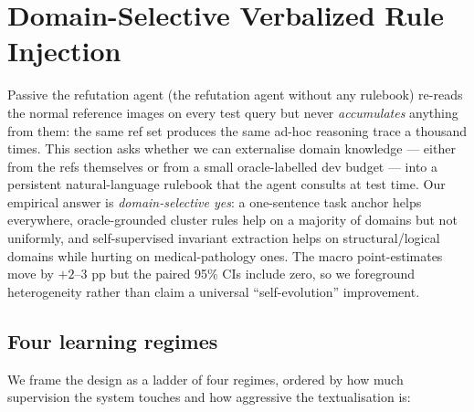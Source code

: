 \section{Domain-Selective Verbalized Rule Injection}
\label{sec:verbalized}

Passive the refutation agent (the refutation agent without any rulebook) re-reads the normal
reference images on every test query but never \emph{accumulates}
anything from them: the same ref set produces the same ad-hoc
reasoning trace a thousand times. This section asks whether we can
externalise domain knowledge --- either from the refs themselves or
from a small oracle-labelled dev budget --- into a persistent
natural-language rulebook that the agent consults at test time.
Our empirical answer is \emph{domain-selective yes}: a
one-sentence task anchor helps everywhere, oracle-grounded cluster
rules help on a majority of domains but not uniformly, and
self-supervised invariant extraction helps on structural/logical
domains while hurting on medical-pathology ones. The macro
point-estimates move by $+2$--$3$ pp but the paired 95\% CIs
include zero, so we foreground heterogeneity rather than claim a
universal ``self-evolution'' improvement.

\subsection{Four learning regimes}
\label{ssec:verb_regimes}

We frame the design as a ladder of four regimes, ordered by how much
supervision the system touches and how aggressive the textualisation
is:

